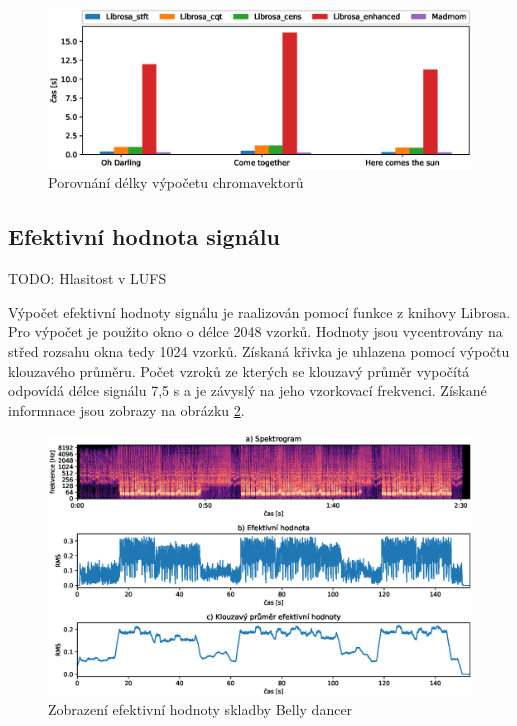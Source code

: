 \begin{figure}[H]
    \centering
    \includegraphics[width = 1\linewidth]{obrazky/Chroma_analysis_times_comparison.eps}
    \caption{Porovnání délky výpočetu chromavektorů}
    \label{fig:Chroma_calculation_time}
\end{figure}

    
\subsection{Efektivní hodnota signálu}
TODO: Hlasitost v LUFS

Výpočet efektivní hodnoty signálu je raalizován pomocí funkce z knihovy Librosa. Pro výpočet je použito okno o délce 2048 vzorků. Hodnoty jsou vycentrovány na střed rozsahu okna tedy 1024 vzorků. Získaná křivka je uhlazena pomocí výpočtu klouzavého průměru. Počet vzroků ze kterých se klouzavý průměr vypočítá odpovídá délce signálu 7,5 s a je závyslý na jeho vzorkovací frekvenci. Získané informnace jsou zobrazy na obrázku \ref{fig:RMS_calculation}.

\begin{figure}[H]
    \centering
    \includegraphics[width = 1\linewidth]{obrazky/Belly_dancer_RMS.eps}
    \caption{Zobrazení efektivní hodnoty skladby Belly dancer}
    \label{fig:RMS_calculation}
\end{figure}



